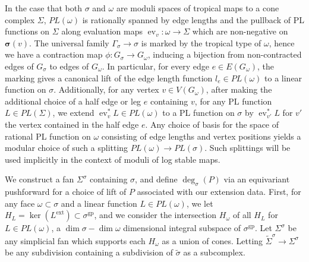 \documentclass[12pt, oneside]{amsart}   	%
\newcommand{\ev}{\operatorname{ev}}
\newcommand{\gp}{\operatorname{gp}}
\numberwithin{equation}{section}
\numberwithin{thm}{section}
\numberwithin{figure}{section}
\begin{document}
In the case that both $\sigma$ and $\omega$ are moduli spaces of tropical maps to a cone complex $\Sigma$, $PL(\omega)$ is rationally spanned by edge lengths and the pullback of PL functions on $\Sigma$ along evaluation maps $\ev_{v}: \omega \rightarrow \Sigma$ which are non-negative on $\pmb\sigma(v)$. The universal family $\Gamma_{\sigma} \rightarrow \sigma$ is marked by the tropical type of $\omega$, hence we have a contraction map $\phi: G_{\sigma} \rightarrow G_{\omega}$, inducing a bijection from non-contracted edges of $G_{\sigma}$ to edges of $G_{\omega}$. In particular, for every edge $e \in E(G_{\omega})$, the marking gives a canonical lift of the edge length function $l_e \in PL(\omega)$ to a linear function on $\sigma$. Additionally, for any vertex $v \in V(G_{\omega})$, after making the additional choice of a half edge or leg $e$ containing $v$, for any PL function $L \in PL(\Sigma)$, we extend $\ev_v^*L \in PL(\omega)$ to a PL function on $\sigma$ by $\ev_{v'}^*L$ for $v'$ the vertex contained in the half edge $e$. Any choice of basis for the space of rational PL function on $\omega$ consisting of edge lengths and vertex positions yields a modular choice of such a splitting $PL(\omega) \rightarrow PL(\sigma)$. Such splittings will be used implicitly in the context of moduli of log stable maps. 









We construct a fan $\Sigma^{\sigma}$ containing $\sigma$, and define $\deg_{\sigma}(P)$ via an equivariant pushforward for a choice of lift of $P$ associated with our extension data. First, for any face $\omega\subset \sigma$ and a linear function $L \in PL(\omega)$, we let $H_L = \ker(L^{\text{ext}}) \subset \sigma^{\gp}$, and we consider the intersection $H_{\omega}$ of all $H_L$ for $L \in PL(\omega)$, a $\dim \sigma - \dim \omega$ dimensional integral subspace of $\sigma^{\gp}$. Let $\Sigma^{\sigma}$ be any simplicial fan which supports each $H_{\omega}$ as a union of cones. Letting $\widetilde{\Sigma}^{\sigma} \rightarrow \Sigma^{\sigma}$ be any subdivision containing a subdivision of $\tilde{\sigma}$ as a subcomplex. 
\end{document}
